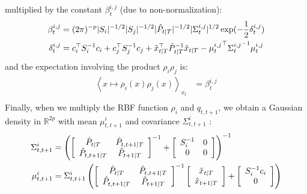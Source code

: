 multiplied by the constant $\beta^{i,j}_t$ (due to non-normalization):
\begin{align*}
  \beta^{i,j}_t &= (2\pi)^{-p} |S_i|^{-1/2} |S_j|^{-1/2} |\hat{P}_{t|T}|^{-1/2} |\Sigma^{i,j}_t|^{1/2} \exp(-\frac{1}{2} \delta^{i,j}_t)\\
  \delta^{i,j}_t &= c_i^{\top} S_i^{-1} c_i + c_j^{\top} S_j^{-1} c_j + \hat{x}_{t \mathbin{\vert} T}^{\top} \hat{P}_{t \mathbin{\vert} T}^{-1} \hat{x}_{t \mathbin{\vert} T} - {\mu^{i,j}_t}^{\top} {\Sigma^{i,j}_t}^{-1} \mu^{i,j}_t\\
\end{align*}
and the expectation involving the product $\rho_i \rho_j$ is:
\begin{align*}
  \left< x \mapsto \rho_i(x)\rho_j(x)\right>_{x_t} &= \beta^{i,j}_t\\
\end{align*}
Finally, when we multiply the RBF function $\rho_i$ and $q_{t,t+1}$, we obtain a Gaussian density in $\mathbb{R}^{2p}$ with mean $\mu^i_{t,t+1}$ and covariance $\Sigma^i_{t,t+1}$ :
\begin{align*}
  \Sigma^i_{t,t+1} &=
    \left(
      \left[
        \begin{array}{cc} \hat{P}_{t \mathbin{\vert} T} & \hat{P}_{t,t+1 \mathbin{\vert} T}\\ \hat{P}_{t,t+1 \mathbin{\vert} T} & \hat{P}_{t+1 \mathbin{\vert} T} \end{array}
      \right]^{-1}
       +
      \left[
        \begin{array}{cc} S_i^{-1} & 0\\ 0 & 0 \end{array}
      \right]
    \right)^{-1}
  \\
  \mu^i_{t,t+1} &= \Sigma^i_{t,t+1}
    \left(
      \left[
        \begin{array}{cc} \hat{P}_{t \mathbin{\vert} T} & \hat{P}_{t,t+1 \mathbin{\vert} T}\\ \hat{P}_{t,t+1 \mathbin{\vert} T} & \hat{P}_{t+1 \mathbin{\vert} T} \end{array}
      \right]^{-1}
      \left[
        \begin{array}{c} \hat{x}_{t \mathbin{\vert} T} \\ \hat{x}_{t+1 \mathbin{\vert} T} \end{array}
      \right] +
      \left[
        \begin{array}{c} S_i^{-1}c_i \\ 0 \end{array}
      \right]
    \right)
  \\
\end{align*}

